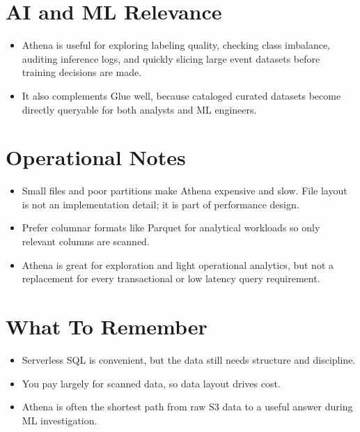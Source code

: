 \documentclass[10pt,twocolumn]{article}
\begin{document}
\section*{AI and ML Relevance}
\begin{itemize}
\item Athena is useful for exploring labeling quality, checking class imbalance, auditing inference logs, and quickly slicing large event datasets before training decisions are made.
\item It also complements Glue well, because cataloged curated datasets become directly queryable for both analysts and ML engineers.
\end{itemize}

\section*{Operational Notes}
\begin{itemize}
\item Small files and poor partitions make Athena expensive and slow. File layout is not an implementation detail; it is part of performance design.
\item Prefer columnar formats like Parquet for analytical workloads so only relevant columns are scanned.
\item Athena is great for exploration and light operational analytics, but not a replacement for every transactional or low latency query requirement.
\end{itemize}

\section*{What To Remember}
\begin{itemize}
\item Serverless SQL is convenient, but the data still needs structure and discipline.
\item You pay largely for scanned data, so data layout drives cost.
\item Athena is often the shortest path from raw S3 data to a useful answer during ML investigation.
\end{itemize}
\end{document}
